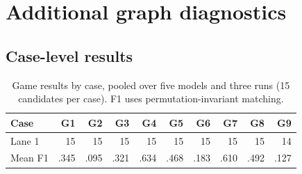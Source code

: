 \documentclass{article}
\begin{document}

%
 
%

\medskip


{
\small






}



\appendix

\section{Additional graph diagnostics}
\subsection{Case-level results}
\begin{table}[h]
\centering
\small
\caption{Game results by case, pooled over five models and three runs (15 candidates per case). F1 uses permutation-invariant matching.}
\label{tab:game_cases}
\begin{tabular}{lrrrrrrrrr}
\toprule
Case & G1 & G2 & G3 & G4 & G5 & G6 & G7 & G8 & G9 \\
\midrule
Lane 1 & 15 & 15 & 15 & 15 & 15 & 15 & 15 & 15 & 14 \\
Mean F1 & .345 & .095 & .321 & .634 & .468 & .183 & .610 & .492 & .127 \\
\bottomrule
\end{tabular}
\end{table}
\end{document}
